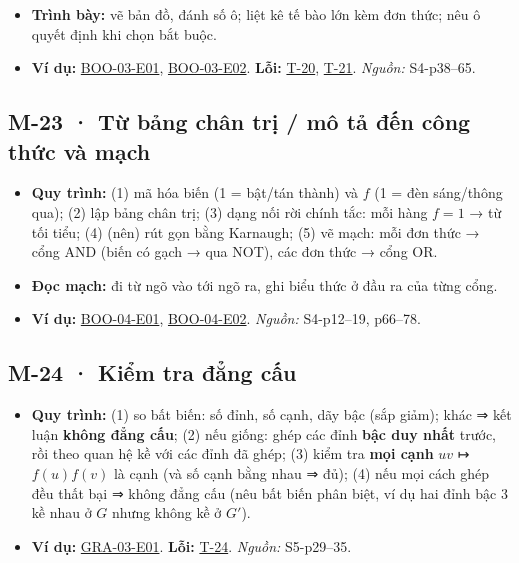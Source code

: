 \documentclass[
  10pt,
  twoside,openany]{book}
\providecommand{\tightlist}{%
  \setlength{\itemsep}{0pt}\setlength{\parskip}{0pt}}
\begin{document}
\begin{itemize}
\tightlist
\item
  \textbf{Trình bày:} vẽ bản đồ, đánh số ô; liệt kê tế bào lớn kèm đơn
  thức; nêu ô quyết định khi chọn bắt buộc.
\item
  \textbf{Ví dụ:} \protect\hyperlink{BOO-03-E01}{BOO-03-E01},
  \protect\hyperlink{BOO-03-E02}{BOO-03-E02}. \textbf{Lỗi:}
  \protect\hyperlink{T-20}{T-20}, \protect\hyperlink{T-21}{T-21}.
  \emph{Nguồn:} S4-p38--65.
\end{itemize}

\hypertarget{M-23}{%
\subsection{M-23 · Từ bảng chân trị / mô tả đến công thức và
mạch}\label{M-23}}

\begin{itemize}
\tightlist
\item
  \textbf{Quy trình:} (1) mã hóa biến (1 = bật/tán thành) và \(f\) (1 =
  đèn sáng/thông qua); (2) lập bảng chân trị; (3) dạng nối rời chính
  tắc: mỗi hàng \(f=1\) → từ tối tiểu; (4) (nên) rút gọn bằng Karnaugh;
  (5) vẽ mạch: mỗi đơn thức → cổng AND (biến có gạch → qua NOT), các đơn
  thức → cổng OR.
\item
  \textbf{Đọc mạch:} đi từ ngõ vào tới ngõ ra, ghi biểu thức ở đầu ra
  của từng cổng.
\item
  \textbf{Ví dụ:} \protect\hyperlink{BOO-04-E01}{BOO-04-E01},
  \protect\hyperlink{BOO-04-E02}{BOO-04-E02}. \emph{Nguồn:} S4-p12--19,
  p66--78.
\end{itemize}

\hypertarget{M-24}{%
\subsection{M-24 · Kiểm tra đẳng cấu}\label{M-24}}

\begin{itemize}
\tightlist
\item
  \textbf{Quy trình:} (1) so bất biến: số đỉnh, số cạnh, dãy bậc (sắp
  giảm); khác ⇒ kết luận \textbf{không đẳng cấu}; (2) nếu giống: ghép
  các đỉnh \textbf{bậc duy nhất} trước, rồi theo quan hệ kề với các đỉnh
  đã ghép; (3) kiểm tra \textbf{mọi cạnh} \(uv\) ↦ \(f(u)f(v)\) là cạnh
  (và số cạnh bằng nhau ⇒ đủ); (4) nếu mọi cách ghép đều thất bại ⇒
  không đẳng cấu (nêu bất biến phân biệt, ví dụ hai đỉnh bậc 3 kề nhau ở
  \(G\) nhưng không kề ở \(G'\)).
\item
  \textbf{Ví dụ:} \protect\hyperlink{GRA-03-E01}{GRA-03-E01}.
  \textbf{Lỗi:} \protect\hyperlink{T-24}{T-24}. \emph{Nguồn:}
  S5-p29--35.
\end{itemize}
\end{document}
